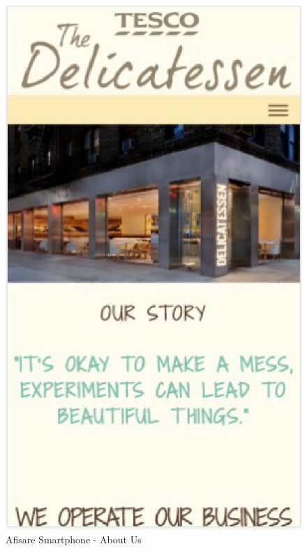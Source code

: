 \documentclass[11pt]{article}
\begin{document}
\begin{figure}[h]
\includegraphics{images/8.eps}
\caption{Afisare Smartphone - About Us}
\end{figure}
\end{document}

